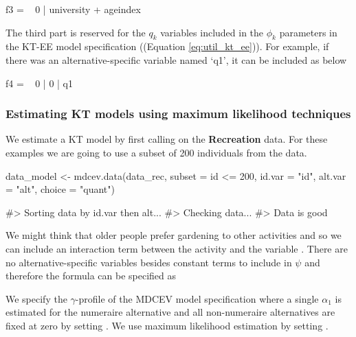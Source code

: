 \begin{example}
f3 = ~ 0 | university + ageindex
\end{example}

The third part is reserved for the \(q_k\) variables included in the
\(\phi_k\) parameters in the KT-EE model specification ((Equation
\ref{eq:util_kt_ee})). For example, if there was an alternative-specific
variable named `q1', it can be included as below

\begin{example}
f4 = ~ 0 | 0 | q1
\end{example}

\hypertarget{estimating-kt-models-using-maximum-likelihood-techniques}{%
\subsubsection{Estimating KT models using maximum likelihood
techniques}\label{estimating-kt-models-using-maximum-likelihood-techniques}}

We estimate a KT model by first calling  on the
\textbf{Recreation} data. For these examples we are going to use a
subset of 200 individuals from the data.

\begin{example}
data_model <- mdcev.data(data_rec, subset = id <= 200,
                       id.var = "id",
                       alt.var = "alt",
                       choice = "quant")  

#> Sorting data by id.var then alt...
#> Checking data...
#> Data is good
\end{example}

We might think that older people prefer gardening to other activities
and so we can include an interaction term between the activity
 and the variable . There are no
alternative-specific variables besides constant terms to include in
\(\psi\) and therefore the formula can be specified as


We specify the \(\gamma\)-profile of the MDCEV model specification where
a single \(\alpha_1\) is estimated for the numeraire alternative and all
non-numeraire alternatives are fixed at zero by setting
. We use maximum likelihood estimation by setting
.

